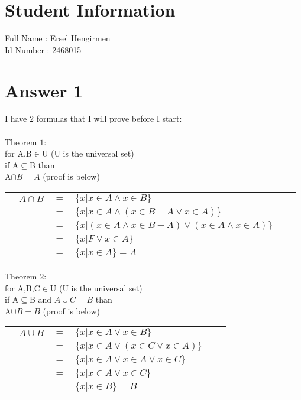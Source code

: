 \documentclass[11pt]{article}
\begin{document}
\section*{Student Information } 
Full Name :  Ersel Hengirmen\\
Id Number :  2468015\\

\section*{Answer 1}
I have $2$ formulas that I will prove before I start:\\ \\
Theorem $1$:\\
for A,B$\in$U (U is the universal set)\\
if A$\subseteq$B than\\
A$\cap B=A$  (proof is below)
\begin{table}[H]
    \begin{tabular}{p{1.4cm}lclll}	
    &$A\cap B$ & $=$ & $\{x | x\in A\land x\in B\}$ \\
    & &$=$&$\{x | x\in A\land (x\in B-A\lor x\in A)\}$ \\
    & &$=$&$\{x | (x\in A\land x\in B-A)\lor(x\in A\land x\in A)\}$ \\
    & &$=$&$\{x | F\lor x\in A\}$ \\
    & &$=$&$\{x | x\in A\}=A$ \\
    \end{tabular}
\end{table}

Theorem $2$:\\
for A,B,C$\in$U (U is the universal set)\\
if A$\subseteq$B and $A\cup C=B$ than\\
A$\cup B=B$  (proof is below)
\begin{table}[H]
    \begin{tabular}{p{1.4cm}lclll}	
    &$A\cup B$ & $=$ & $\{x | x\in A\lor x\in B\}$ \\
    & &$=$&$\{x | x\in A\lor (x\in C\lor x\in A)\}$ \\
    & &$=$&$\{x | x\in A\lor x\in A\lor x\in C\}$ \\
    & &$=$&$\{x | x\in A\lor x\in C\}$ \\
    & &$=$&$\{x | x\in B\}=B$ \\
    \end{tabular}
\end{table}
\end{document}
